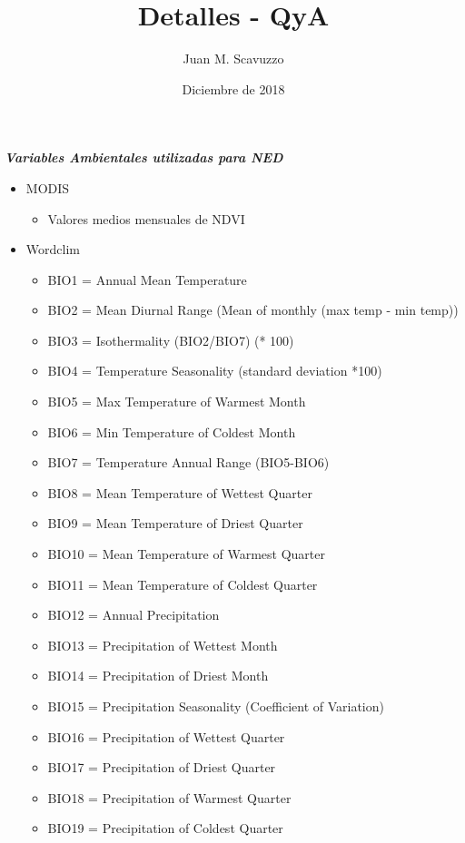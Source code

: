 \documentclass[10pt]{beamer}
\title{Detalles - QyA}
\date{Diciembre de 2018}
\author{Juan M. Scavuzzo}
\institute{Facultad de Matemática, Astronomía, Física y Computación \\ Universidad Nacional de Córdoba}
\newcommand\IncrFont{\fontsize{20}{20}\selectfont}
\begin{document}
\maketitle



\begin{frame}{}
  \IncrFont
  \begin{center}
    \textit{\textbf{Variables Ambientales utilizadas para NED}}
  \end{center}
\end{frame}

\begin{frame}
  \begin{itemize}
    \item MODIS
      \begin{itemize}
        \item Valores medios mensuales de NDVI
      \end{itemize}
    \item Wordclim
      \begin{itemize}
        \item BIO1 = Annual Mean Temperature
        \item BIO2 = Mean Diurnal Range (Mean of monthly (max temp - min temp))
        \item BIO3 = Isothermality (BIO2/BIO7) (* 100)
        \item BIO4 = Temperature Seasonality (standard deviation *100)
        \item BIO5 = Max Temperature of Warmest Month
        \item BIO6 = Min Temperature of Coldest Month
        \item BIO7 = Temperature Annual Range (BIO5-BIO6)
        \item BIO8 = Mean Temperature of Wettest Quarter
        \item BIO9 = Mean Temperature of Driest Quarter
        \item BIO10 = Mean Temperature of Warmest Quarter
        \item BIO11 = Mean Temperature of Coldest Quarter
        \item BIO12 = Annual Precipitation
        \item BIO13 = Precipitation of Wettest Month
        \item BIO14 = Precipitation of Driest Month
        \item BIO15 = Precipitation Seasonality (Coefficient of Variation)
        \item BIO16 = Precipitation of Wettest Quarter
        \item BIO17 = Precipitation of Driest Quarter
        \item BIO18 = Precipitation of Warmest Quarter
        \item BIO19 = Precipitation of Coldest Quarter
      \end{itemize}
  \end{itemize}
\end{frame}
\end{document}
